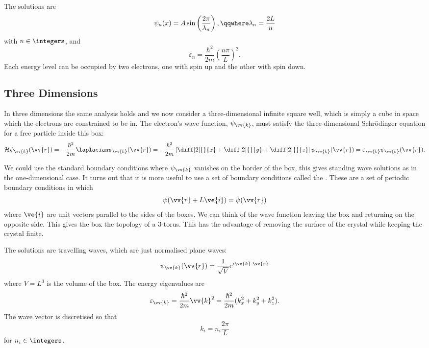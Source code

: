 \documentclass[fleqn]{NotesClass}
\newcommand*{\e}{\mathrm{e}}
\newcommand*{\hamiltonian}{\mathcal{H}}
\begin{document}
    The solutions are
    \begin{equation}
        \psi_n(x) = A\sin\left( \frac{2\pi}{\lambda_n} \right), \qqwhere \lambda_n = \frac{2 L}{n}
    \end{equation}
    with \(n \in \integers\), and
    \begin{equation}
        \varepsilon_n = \frac{\hbar^2}{2m} \left( \frac{n\pi}{L} \right)^2.
    \end{equation}
    Each energy level can be occupied by two electrons, one with spin up and the other with spin down.
    
    \subsection{Three Dimensions}
    In three dimensions the same analysis holds and we now consider a three-dimensional infinite square well, which is simply a cube in space which the electrons are constrained to be in.
    The electron's wave function, \(\psi_{\vv{k}}\), must satisfy the three-dimensional Schr\"odinger equation for a free particle inside this box:
    \begin{equation}
        \hamiltonian\psi_{\vv{k}}(\vv{r}) = -\frac{\hbar^2}{2m}\laplacian \psi_{\vv{k}}(\vv{r}) = -\frac{\hbar^2}{2m} \left[ \diff[2]{}{x} + \diff[2]{}{y} + \diff[2]{}{z} \right]\psi_{\vv{k}}(\vv{r}) = \varepsilon_{\vv{k}}\psi_{\vv{k}}(\vv{r}).
    \end{equation}
    
    We could use the standard boundary conditions where \(\psi_{\vv{k}}\) vanishes on the border of the box, this gives standing wave solutions as in the one-dimensional case.
    It turns out that it is more useful to use a set of boundary conditions called the .
    These are a set of periodic boundary conditions in which
    \begin{equation}
        \psi(\vv{r} + L\ve{i}) = \psi(\vv{r})
    \end{equation}
    where \(\ve{i}\) are unit vectors parallel to the sides of the boxes.
    We can think of the wave function leaving the box and returning on the opposite side.
    This gives the box the topology of a 3-torus.
    This has the advantage of removing the surface of the crystal while keeping the crystal finite.
    
    The solutions are travelling waves, which are just normalised plane waves:
    \begin{equation}
        \psi_{\vv{k}}(\vv{r}) = \frac{1}{\sqrt{V}} \e^{i\vv{k} \cdot \vv{r}}
    \end{equation}
    where \(V = L^3\) is the volume of the box.
    The energy eigenvalues are 
    \begin{equation}
        \varepsilon_{\vv{k}} = \frac{\hbar^2}{2m}\vv{k}^2 = \frac{\hbar^2}{2m}(k_x^2 + k_y^2 + k_z^2).
    \end{equation}
    The wave vector is discretised so that
    \begin{equation}
        k_i = n_i\frac{2\pi}{L}
    \end{equation}
    for \(n_i \in \integers\).
    
\end{document}
